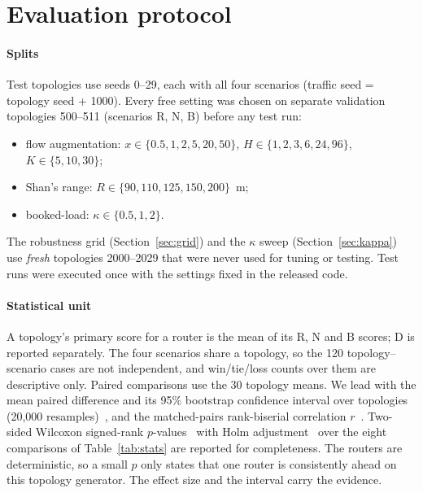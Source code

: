 \section{Evaluation protocol}\label{sec:setup}

\paragraph{Splits} Test topologies use seeds 0--29, each with all four scenarios (traffic seed = topology seed + 1000). Every free setting was chosen on separate validation topologies 500--511 (scenarios R, N, B) before any test run:
\begin{itemize}[leftmargin=*]
  \item flow augmentation: $x\in\{0.5,1,2,5,20,50\}$, $H\in\{1,2,3,6,24,96\}$, $K\in\{5,10,30\}$;
  \item Shan's range: $R\in\{90,110,125,150,200\}$~m;
  \item booked-load: $\kappa\in\{0.5,1,2\}$.
\end{itemize}
The robustness grid (Section~\ref{sec:grid}) and the $\kappa$ sweep (Section~\ref{sec:kappa}) use \emph{fresh} topologies 2000--2029 that were never used for tuning or testing. Test runs were executed once with the settings fixed in the released code.

\paragraph{Statistical unit} A topology's primary score for a router is the mean of its R, N and B scores; D is reported separately. The four scenarios share a topology, so the 120 topology--scenario cases are not independent, and win/tie/loss counts over them are descriptive only. Paired comparisons use the 30 topology means. We lead with the mean paired difference and its 95\% bootstrap confidence interval over topologies (20{,}000 resamples)~\cite{efron1993bootstrap}, and the matched-pairs rank-biserial correlation $r$~\cite{kerby2014}. Two-sided Wilcoxon signed-rank $p$-values~\cite{wilcoxon1945,demsar2006} with Holm adjustment~\cite{holm1979} over the eight comparisons of Table~\ref{tab:stats} are reported for completeness. The routers are deterministic, so a small $p$ only states that one router is consistently ahead on this topology generator. The effect size and the interval carry the evidence.
